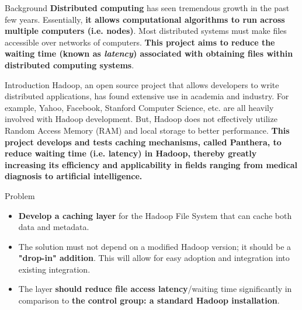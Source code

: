 \documentclass[final]{beamer} %
\begin{document}
  \begin{frame}
    \begin{center}

      \textcolor{black}{
      \textbf{}
      \vspace{0.5em}
      \textbf{}}
    \end{center}
    
    \begin{columns}[t]
     \begin{column}{0.32\textwidth}
      \begin{block}{Background}
      \textbf{Distributed computing} has seen tremendous growth in the past few years. 
      Essentially, \textbf{it allows computational algorithms to run across multiple
      computers (i.e. nodes)}. Most distributed systems must make files accessible over 	networks of computers. \textbf{This 
      project aims to reduce the waiting time (known as \textit{latency}) associated
      with obtaining files within distributed computing systems}.
      \end{block}
      \begin{block}{Introduction}
      Hadoop, an open source project that allows developers to
write distributed applications, has found extensive use in academia and industry. For example, Yahoo, Facebook, Stanford Computer Science, etc. are all heavily involved with Hadoop development. But, Hadoop does not effectively utilize Random Access Memory (RAM) and local storage to better performance. \textbf{This project develops and tests caching mechanisms, called \textbf{Panthera}, to reduce waiting time (i.e. latency) in Hadoop, thereby greatly increasing its efficiency and applicability in fields ranging from medical diagnosis to artificial intelligence.}
      \end{block}

    \begin{block}{Problem}
	\begin{itemize}
	 \item \textbf{Develop a caching layer} for the Hadoop File System that can cache both data and metadata.
	 \item The solution must not depend on a modified Hadoop version; it should be a \textbf{"drop-in" addition}. This will allow for easy adoption and integration into existing integration.
	 \item The layer \textbf{should reduce file access latency}/waiting time significantly in comparison to \textbf{the control group: a standard Hadoop installation}.
	\end{itemize}


\end{block}
\end{column}
\end{columns}
\end{frame}
\end{document}
